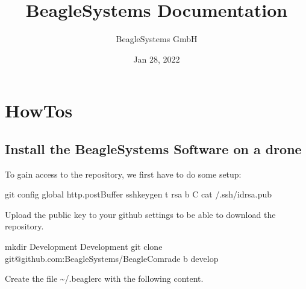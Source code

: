 \documentclass[letterpaper,10pt,english]{sphinxmanual}
\title{BeagleSystems Documentation}
\date{Jan 28, 2022}
\author{BeagleSystems GmbH}
\begin{document}
\pagestyle{empty}
\sphinxmaketitle
\pagestyle{plain}
\sphinxtableofcontents
\pagestyle{normal}
\label{\detokenize{index::doc}}



\chapter{HowTos}
\label{\detokenize{source/howtos:howtos}}\label{\detokenize{source/howtos::doc}}

\section{Install the BeagleSystems Software on a drone}
\label{\detokenize{source/howtos/install:install-the-beaglesystems-software-on-a-drone}}\label{\detokenize{source/howtos/install::doc}}
To gain access to the repository, we first have to do some setup:

\begin{sphinxVerbatim}[commandchars=\\\{\}]
\PYGZdl{} git config \PYGZhy{}\PYGZhy{}global http.postBuffer 
\PYGZdl{} ssh\PYGZhy{}keygen \PYGZhy{}t rsa \PYGZhy{}b  \PYGZhy{}C 
\PYGZdl{} cat \PYGZti{}/.ssh/id\PYGZus{}rsa.pub
\end{sphinxVerbatim}

Upload the public key to your github settings to be able to download the repository.

\begin{sphinxVerbatim}[commandchars=\\\{\}]
\PYGZdl{} mkdir Development
\PYGZdl{}  Development
\PYGZdl{} git clone git@github.com:BeagleSystems/BeagleComrade \PYGZhy{}b develop
\end{sphinxVerbatim}

Create the file \textasciitilde{}/.beaglerc with the following content.
\end{document}
